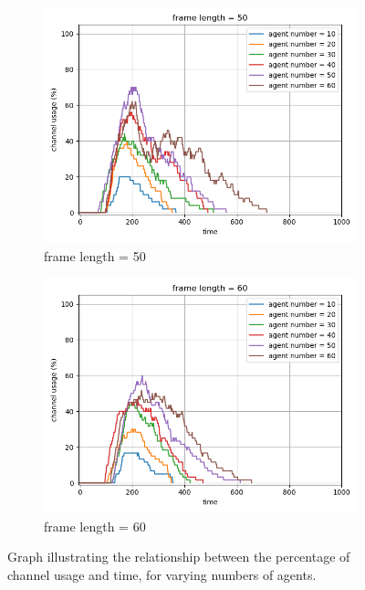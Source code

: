 \begin{figure}[htbp]
    \vspace{1cm}
    
    \begin{subfigure}[t]{0.45\linewidth}
        \centering
        \includegraphics[width=\linewidth]{figures/channel_usage_frame50.png}
        \caption{frame length = 50}
        \label{fig:framepercent5}
    \end{subfigure}
    \hfill
    \begin{subfigure}[t]{0.45\linewidth}
        \centering
        \includegraphics[width=\linewidth]{figures/channel_usage_frame60.png}
        \caption{frame length = 60}
        \label{fig:framepercent6}
    \end{subfigure}
    
    \caption{Graph illustrating the relationship between the percentage of channel usage and time, for varying numbers of agents.}
    \label{fig:channelpercent}
\end{figure}


